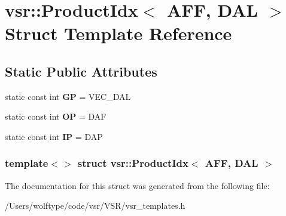 \hypertarget{structvsr_1_1_product_idx_3_01_a_f_f_00_01_d_a_l_01_4}{\section{vsr\-:\-:Product\-Idx$<$ A\-F\-F, D\-A\-L $>$ Struct Template Reference}
\label{structvsr_1_1_product_idx_3_01_a_f_f_00_01_d_a_l_01_4}
}
\subsection*{Static Public Attributes}
\begin{DoxyCompactItemize}
\item 
\hypertarget{structvsr_1_1_product_idx_3_01_a_f_f_00_01_d_a_l_01_4_ac11a30ebc6577d60139c03b1e64d8fab}{static const int {\bfseries G\-P} = V\-E\-C\-\_\-\-D\-A\-L}\label{structvsr_1_1_product_idx_3_01_a_f_f_00_01_d_a_l_01_4_ac11a30ebc6577d60139c03b1e64d8fab}

\item 
\hypertarget{structvsr_1_1_product_idx_3_01_a_f_f_00_01_d_a_l_01_4_a6a6a4ed51bd2f72053b5112b2a666a97}{static const int {\bfseries O\-P} = D\-A\-F}\label{structvsr_1_1_product_idx_3_01_a_f_f_00_01_d_a_l_01_4_a6a6a4ed51bd2f72053b5112b2a666a97}

\item 
\hypertarget{structvsr_1_1_product_idx_3_01_a_f_f_00_01_d_a_l_01_4_ab209d4591ac4cbd36cf52cdf18609aac}{static const int {\bfseries I\-P} = D\-A\-P}\label{structvsr_1_1_product_idx_3_01_a_f_f_00_01_d_a_l_01_4_ab209d4591ac4cbd36cf52cdf18609aac}

\end{DoxyCompactItemize}
\subsubsection*{template$<$$>$ struct vsr\-::\-Product\-Idx$<$ A\-F\-F, D\-A\-L $>$}



The documentation for this struct was generated from the following file\-:\begin{DoxyCompactItemize}
\item 
/\-Users/wolftype/code/vsr/\-V\-S\-R/vsr\-\_\-templates.\-h\end{DoxyCompactItemize}
